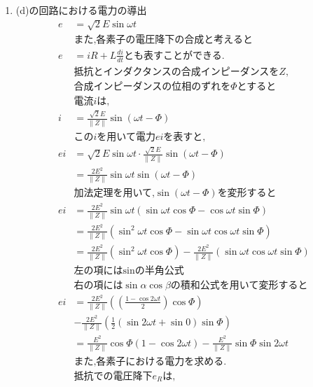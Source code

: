 \documentclass[twocolumn]{article}
\begin{document}
\begin{enumerate}
    \item (d)の回路における電力の導出
    \begin{align*}
      e   &=\sqrt{2}E\sin\omega t\\
      &\text{また,各素子の電圧降下の合成と考えると}\\
      e   &=iR + L \frac{di}{dt} \text{とも表すことができる.} \\
      &\text{抵抗とインダクタンスの合成インピーダンスを} Z \text{,}\\
      &\text{合成インピーダンスの位相のずれを} \Phi \text{とすると}\\
      &\text{電流} i \text{は,}\\
      i   &= \frac{\sqrt{2}E}{\|Z\|} \sin \left( \omega t - \Phi\right)\\
      &\text{この} i \text{を用いて電力} ei \text{を表すと,}\\
      ei  &= \sqrt{2}E\sin\omega t \cdot \frac{\sqrt{2}E}{\|Z\|} \sin \left( \omega t - \Phi\right) \\
          &= \frac{2E^2}{\|Z\|}\sin\omega t \sin \left(\omega t - \Phi\right)\\
      &\text{加法定理を用いて,}\sin \left(\omega t - \Phi\right) \text{を変形すると}\\
      ei  &= \frac{2E^2}{\|Z\|}\sin\omega t \left(\sin\omega t \cos \Phi - \cos\omega t \sin \Phi\right)\\
          &= \frac{2E^2}{\|Z\|} \left(\sin^2 \omega t \cos \Phi - \sin\omega t \cos\omega t \sin \Phi\right)\\
          &= \frac{2E^2}{\|Z\|} \left(\sin^2 \omega t \cos \Phi \right) - \frac{2E^2}{\|Z\|} \left(\sin\omega t \cos\omega t \sin \Phi\right)\\
      &\text{左の項にはsinの半角公式}\\
      &\text{右の項には} \sin \alpha \cos \beta \text{の積和公式を用いて変形すると}\\
      ei  &= \frac{2E^2}{\|Z\|} \left(\left(\frac{1-\cos2\omega t}{2}\right)\cos \Phi\right)\\
          &- \frac{2E^2}{\|Z\|}\left(\frac{1}{2}\left(\sin2\omega t + \sin0\right) \sin \Phi\right)\\
          &= \frac{E^2}{\|Z\|} \cos \Phi \left(1-\cos2\omega t\right) - \frac{E^2}{\|Z\|} \sin \Phi\sin2\omega t \\
      &\text{また,各素子における電力を求める.}\\
          &\text{抵抗での電圧降下}e_R \text{は,}\\

\end{align*}
\end{enumerate}
\end{document}
